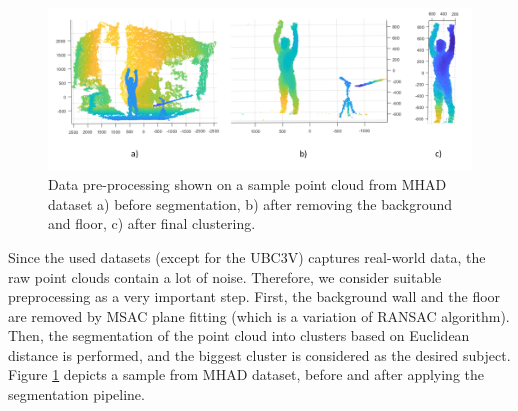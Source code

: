 
\vspace{5mm}

\begin{figure}[H]
\begin{center}
  \includegraphics[width=\textwidth]{images/implementation/mhad.png}
  \caption[Data pre-processing shown on a sample point cloud from MHAD dataset \cite{Vidal:2013:BMC:2478277.2478412}.]{ Data pre-processing shown on a sample point cloud from MHAD dataset \cite{Vidal:2013:BMC:2478277.2478412} a) before segmentation, b) after removing the background and floor, c) after final clustering.}
  \label{fig:mhad}
\end{center}
\end{figure}

\noindent
Since the used datasets (except for the UBC3V) captures real-world data, the raw point clouds contain a lot of noise. Therefore, we consider suitable preprocessing as a very important step. First, the background wall and the floor are removed by MSAC plane fitting (which is a variation of RANSAC algorithm). Then, the segmentation of the point cloud into clusters based on Euclidean distance is performed, and the biggest cluster is considered as the desired subject. Figure \ref{fig:mhad} depicts a sample from MHAD dataset, before and after applying the segmentation pipeline.%
\par

